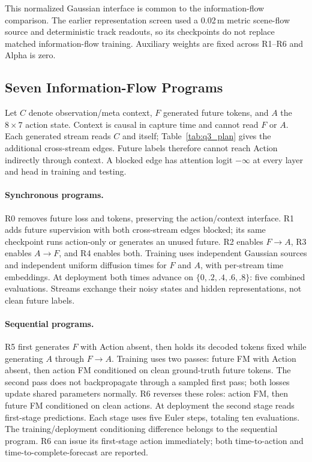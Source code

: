 This normalized Gaussian interface is common to the information-flow
comparison. The earlier representation screen used a 0.02\,m metric
scene-flow source and deterministic track readouts, so its checkpoints
do not replace matched information-flow training. Auxiliary weights are
fixed across R1--R6 and Alpha is zero.

\subsection{Seven Information-Flow Programs}

Let $C$ denote observation/meta context, $F$ generated future tokens, and
$A$ the $8\times7$ action state. Context is causal in capture time and cannot
read $F$ or $A$. Each generated stream reads $C$ and itself;
Table~\ref{tab:q3_plan} gives the additional cross-stream edges. Future
labels therefore cannot reach Action indirectly through context. A blocked
edge has attention logit $-\infty$ at every layer and head in training and
testing.

\paragraph{Synchronous programs.}
R0 removes future loss and tokens, preserving the action/context interface.
R1 adds future supervision with both cross-stream edges blocked; its same
checkpoint runs action-only or generates an unused future. R2 enables
$F\!\to\!A$, R3 enables $A\!\to\!F$, and R4 enables both. Training uses
independent Gaussian sources and independent uniform diffusion times for
$F$ and $A$, with per-stream time embeddings. At deployment both times
advance on $\{0,.2,.4,.6,.8\}$: five combined evaluations. Streams exchange
their noisy states and hidden representations, not clean future labels.

\paragraph{Sequential programs.}
R5 first generates $F$ with Action absent, then holds its decoded tokens fixed
while generating $A$ through $F\!\to\!A$. Training uses two passes: future FM
with Action absent, then action FM conditioned on clean ground-truth future
tokens. The second pass does not backpropagate through a sampled first
pass; both losses update shared parameters normally. R6 reverses these
roles: action FM, then future FM conditioned on clean actions. At deployment
the second stage reads first-stage predictions. Each stage uses five Euler
steps, totaling ten evaluations. The training/deployment conditioning
difference belongs to the sequential program. R6 can issue its first-stage
action immediately; both time-to-action and time-to-complete-forecast are
reported.


